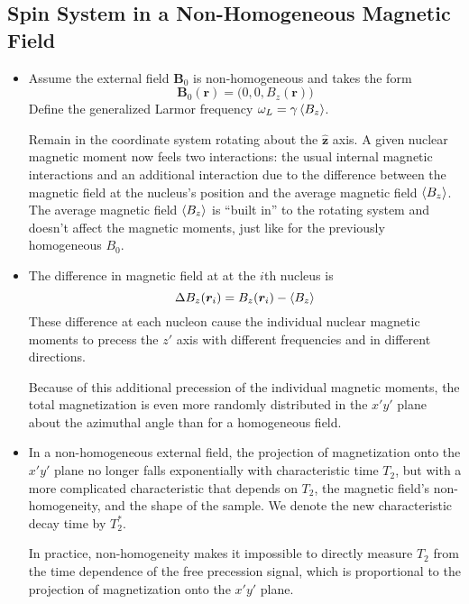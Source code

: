 \documentclass[11pt, a4paper]{article}
\renewcommand{\vec}[1]{\bm{#1}}
\newcommand{\uvec}[1]{\hat{\bm{#1}}}
\newcommand{\B}{\vec{B}}  %
\begin{document}
\subsection{Spin System in a Non-Homogeneous Magnetic Field}
\begin{itemize}
	\item Assume the external field $ \B_{0} $ is non-homogeneous and takes the form
	\begin{equation*}
		\B_{0}(\vec{r}) = \big(0, 0, B_{z}(\vec{r})\big)
	\end{equation*}
	Define the generalized Larmor frequency $ \omega_{L} = \gamma \ev{B_{z}} $.
	
	Remain in the coordinate system rotating about the $ \uvec{z} $ axis. A given nuclear magnetic moment now feels two interactions: the usual internal magnetic interactions and an additional interaction due to the difference between the magnetic field at the nucleus's position and the average magnetic field $ \ev{B_{z}} $. The average magnetic field $ \ev{B_{z}} $ is ``built in'' to the rotating system and doesn't affect the magnetic moments, just like for the previously homogeneous $ B_{0} $. 
	
	\item The difference in magnetic field at at the $ i $th nucleus is
	\begin{equation*}
		\Delta B_{z}(\vec{r}_{i}) = B_{z}(\vec{r}_{i}) - \ev{B_{z}} 
	\end{equation*}
	These difference at each nucleon cause the individual nuclear magnetic moments to precess the $ z' $ axis with different frequencies and in different directions.
	
	Because of this additional precession of the individual magnetic moments, the total magnetization is even more randomly distributed in the $ x'y' $ plane about the azimuthal angle than for a homogeneous field. 
	
	\item In a non-homogeneous external field, the projection of magnetization onto the $ x'y' $ plane no longer falls exponentially with characteristic time $ T_{2} $, but with a more complicated characteristic that depends on $ T_{2} $, the magnetic field's non-homogeneity, and the shape of the sample. We denote the new characteristic decay time by $ T_{2}^{*} $.
	
	In practice, non-homogeneity makes it impossible to directly measure $ T_{2} $ from the time dependence of the free precession signal, which is proportional to the projection of magnetization onto the $ x'y' $ plane.
	

\end{itemize}
\end{document}
